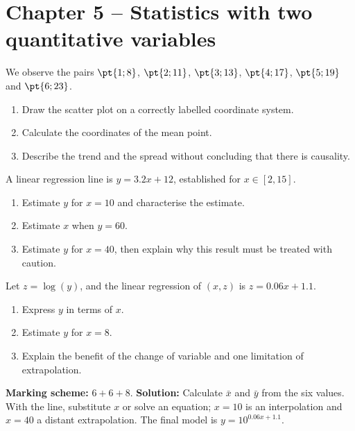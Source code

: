 \section*{Chapter 5 -- Statistics with two quantitative variables}
\begin{exercise}
We observe the pairs $\pt{1;8}$, $\pt{2;11}$, $\pt{3;13}$, $\pt{4;17}$, $\pt{5;19}$ and $\pt{6;23}$.
\begin{enumerate}
\item Draw the scatter plot on a correctly labelled coordinate system.
\item Calculate the coordinates of the mean point.
\item Describe the trend and the spread without concluding that there is causality.
\end{enumerate}
\end{exercise}
\begin{exercise}
A linear regression line is $y=\num{3,2}x+12$, established for $x\in[2,15]$.
\begin{enumerate}
\item Estimate $y$ for $x=10$ and characterise the estimate.
\item Estimate $x$ when $y=60$.
\item Estimate $y$ for $x=40$, then explain why this result must be treated with caution.
\end{enumerate}
\end{exercise}
\begin{exercise}
Let $z=\log(y)$, and the linear regression of $(x,z)$ is $z=\num{0,06}x+\num{1,1}$.
\begin{enumerate}
\item Express $y$ in terms of $x$.
\item Estimate $y$ for $x=8$.
\item Explain the benefit of the change of variable and one limitation of extrapolation.
\end{enumerate}
\end{exercise}
\begin{solution}\textbf{Marking scheme:} $6+6+8$. \textbf{Solution:} Calculate $\bar x$ and $\bar y$ from the six values. With the line, substitute $x$ or solve an equation; $x=10$ is an interpolation and $x=40$ a distant extrapolation. The final model is $y=10^{\num{0,06}x+\num{1,1}}$.\end{solution}

